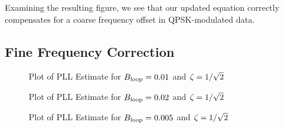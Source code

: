 \documentclass{article}
\begin{document}
\noindent Examining the resulting figure, we see that our updated equation correctly compensates for a coarse frequency offset in QPSK-modulated data.

\subsection{Fine Frequency Correction}

\begin{figure}[H]
	\centerline{}
	\caption{Plot of PLL Estimate for $\protect{B_\text{loop}} = 0.01$ and $\protect{\zeta = 1/\sqrt{2}}$}
	\label{fig::convergence_Bloop_0p01_damp_sqrt_2}
\end{figure}

\begin{figure}[H]
	\centerline{}
	\caption{Plot of PLL Estimate for $\protect{B_\text{loop}} = 0.02$ and $\protect{\zeta = 1/\sqrt{2}}$}
	\label{fig::convergence_Bloop_0p02_damp_sqrt_2}
\end{figure}

\begin{figure}[H]
	\centerline{}
	\caption{Plot of PLL Estimate for $\protect{B_\text{loop}} = 0.005$ and $\protect{\zeta = 1/\sqrt{2}}$}
	\label{fig::convergence_Bloop_0p005_damp_sqrt_2}
\end{figure}
\end{document}
